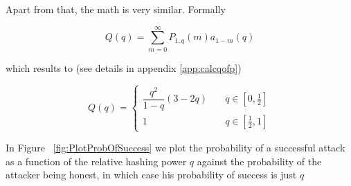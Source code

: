 \documentclass[letterpaper,12pt]{report}
\theoremstyle{plain}
\theoremstyle{definition}
\begin{document}

Apart from that, the math is very similar. Formally 

\begin{equation}\label{eq:qofpdef}
\mathit{Q}(q)=\sum_{m=0}^{\infty}\mathit{P}_{1,q}(m)\mathit{a}_{1-m}(q)
\end{equation}

which results to (see details in appendix \ref{app:calcqofp})

\begin{equation}\label{eq:qofp}
\mathit{Q}(q)=
\begin{cases}
\dfrac{q^2}{1-q}\left(3-2q\right) & \quad q \in [0,\frac{1}{2}] \\
1 & \quad q \in [\frac{1}{2},1] 
\end{cases}
\end{equation}

In Figure ~\ref{fig:PlotProbOfSuccess} we plot the probability of a successful attack as a function of the relative hashing power $q$ against the probability of the attacker being honest, in which case his probability of success is just $q$
\end{document}
